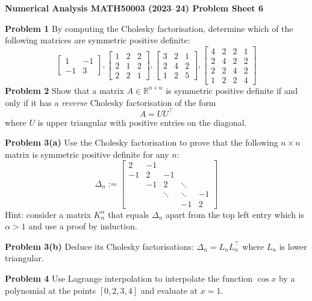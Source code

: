 \documentclass[12pt,a4paper]{article}
\def\endash{–}
\def\bbR{ {\mathbb R} }
\begin{document}
\textbf{Numerical Analysis MATH50003 (2023\ensuremath{\endash}24) Problem Sheet 6}

\textbf{Problem 1} By computing the Cholesky factorisation, determine which of the following matrices are symmetric positive definite:
\[
\begin{bmatrix} 1 & -1  \\
-1 & 3
\end{bmatrix}, \begin{bmatrix} 1 & 2 & 2  \\
2 & 1 & 2\\
2 & 2 & 1
\end{bmatrix}, \begin{bmatrix} 3 & 2 & 1  \\
2 & 4 & 2\\
1 & 2 & 5
\end{bmatrix}, 
\begin{bmatrix} 4 & 2 & 2 & 1  \\
2 & 4 & 2 & 2\\
2 & 2 & 4 & 2 \\
1 & 2 & 2 & 4
\end{bmatrix}
\]
\textbf{Problem 2} Show that a matrix $A \ensuremath{\in} \ensuremath{\bbR}^{n \ensuremath{\times} n}$ is symmetric positive definite if and only if it has a \emph{reverse} Cholesky factorisation of the form
\[
A = U U^\ensuremath{\top}
\]
where $U$ is upper triangular with positive entries on the diagonal.

\textbf{Problem 3(a)} Use the Cholesky factorisation to prove that the following $n \ensuremath{\times} n$ matrix is symmetric positive definite for any $n$:
\[
\ensuremath{\Delta}_n := \begin{bmatrix}
2 & -1 \\
-1 & 2 & -1 \\
& -1 & 2 & \ensuremath{\ddots} \\
&& \ensuremath{\ddots} & \ensuremath{\ddots} & -1 \\
&&& -1 & 2
\end{bmatrix}
\]
Hint: consider a matrix $K_n^\ensuremath{\alpha}$ that equals $\ensuremath{\Delta}_n$ apart from the top left entry which is $\ensuremath{\alpha} > 1$ and use a proof by induction.

\textbf{Problem 3(b)}  Deduce its Cholesky factorisations: $\ensuremath{\Delta}_n = L_n L_n^\ensuremath{\top}$ where $L_n$ is lower triangular.

\textbf{Problem 4} Use Lagrange interpolation to interpolate the function $\cos x$ by a polynomial at the points $[0,2,3,4]$ and evaluate at $x = 1$. 
\end{document}
